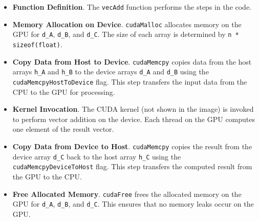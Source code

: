 \begin{examplebox}
\begin{itemize}
        \item \textbf{Function Definition}. The \texttt{vecAdd} function performs the steps in the code.

        \item \textbf{Memory Allocation on Device}. \texttt{cudaMalloc} allocates memory on the GPU for \texttt{d\_A}, \texttt{d\_B}, and \texttt{d\_C}. The size of each array is determined by \texttt{n * sizeof(float)}.
        
        \item \textbf{Copy Data from Host to Device}. \texttt{cudaMemcpy} copies data from the host arrays \texttt{h\_A} and \texttt{h\_B} to the device arrays \texttt{d\_A} and \texttt{d\_B} using the \texttt{cudaMemcpyHostToDevice} flag. This step transfers the input data from the CPU to the GPU for processing.

        \item \textbf{Kernel Invocation}. The CUDA kernel (not shown in the image) is invoked to perform vector addition on the device. Each thread on the GPU computes one element of the result vector.

        \item \textbf{Copy Data from Device to Host}. \texttt{cudaMemcpy} copies the result from the device array \texttt{d\_C} back to the host array \texttt{h\_C} using the \texttt{cudaMemcpyDeviceToHost} flag. This step transfers the computed result from the GPU to the CPU.

        \item \textbf{Free Allocated Memory}. \texttt{cudaFree} frees the allocated memory on the GPU for \texttt{d\_A}, \texttt{d\_B}, and \texttt{d\_C}. This ensures that no memory leaks occur on the GPU.
    \end{itemize}
\end{examplebox}

